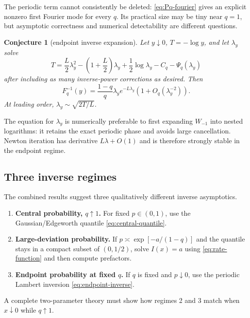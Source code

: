 \documentclass[11pt]{article}
\newtheorem{conjecture}[theorem]{Conjecture}
\theoremstyle{definition}
\theoremstyle{remark}
\begin{document}
The periodic term cannot consistently be deleted: \cref{eq:Pq-fourier} gives an explicit nonzero first Fourier mode for every $q$.  Its practical size may be tiny near $q=1$, but asymptotic correctness and numerical detectability are different questions.

\begin{conjecture}[endpoint inverse expansion]\label{conj:endpoint-inverse}
Let $y\downarrow0$, $T=-\log y$, and let $\lambda_y$ solve
\begin{equation}\label{eq:inverse-lambda-equation}
 T=\frac L2\lambda_y^2-
 \left(1+\frac L2\right)\lambda_y
 +\frac12\log\lambda_y-C_q-\Psi_q(\lambda_y)
\end{equation}
after including as many inverse-power corrections as desired.  Then
\begin{equation}\label{eq:endpoint-inverse}
 F_q^{-1}(y)=\frac{1-q}{q}\lambda_y e^{-L\lambda_y}
 \left(1+O_q(\lambda_y^{-2})\right).
\end{equation}
At leading order, $\lambda_y\sim\sqrt{2T/L}$.
\end{conjecture}

The equation for $\lambda_y$ is numerically preferable to first expanding $W_{-1}$ into nested logarithms: it retains the exact periodic phase and avoids large cancellation.  Newton iteration has derivative $L\lambda+O(1)$ and is therefore strongly stable in the endpoint regime.

\subsection{Three inverse regimes}

The combined results suggest three qualitatively different inverse asymptotics.
\begin{enumerate}
  \item \textbf{Central probability, $q\uparrow1$.}  For fixed $p\in(0,1)$, use the Gaussian/Edgeworth quantile \cref{eq:central-quantile}.
  \item \textbf{Large-deviation probability.}  If $p\asymp\exp[-a/(1-q)]$ and the quantile stays in a compact subset of $(0,1/2)$, solve $I(x)=a$ using \cref{eq:rate-function} and then compute prefactors.
  \item \textbf{Endpoint probability at fixed $q$.}  If $q$ is fixed and $p\downarrow0$, use the periodic Lambert inversion \cref{eq:endpoint-inverse}.
\end{enumerate}
A complete two-parameter theory must show how regimes 2 and 3 match when $x\downarrow0$ while $q\uparrow1$.
\end{document}
